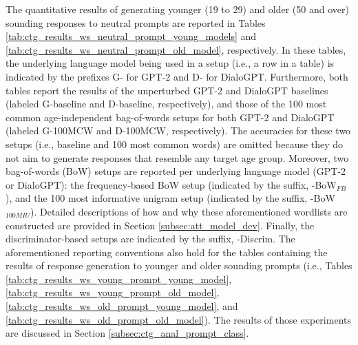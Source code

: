 
The quantitative results of generating younger (19 to 29) and older (50 and over) sounding responses to neutral prompts are reported in Tables \ref{tab:ctg_results_ws_neutral_prompt_young_models} and \ref{tab:ctg_results_ws_neutral_prompt_old_model}, respectively. In these tables, the underlying language model being used in a setup (i.e., a row in a table) is indicated by the prefixes G- for GPT-2 and D- for DialoGPT. Furthermore, both tables report the results of the unperturbed GPT-2 and DialoGPT baselines (labeled G-baseline and D-baseline, respectively), and those of the 100 most common age-independent bag-of-words setups for both GPT-2 and DialoGPT (labeled G-100MCW and D-100MCW, respectively). The accuracies for these two setups (i.e., baseline and 100 most common words) are omitted because they do not aim to generate responses that resemble any target age group. Moreover, two bag-of-words (BoW) setups are reported per underlying language model (GPT-2 or DialoGPT): the frequency-based BoW setup (indicated by the suffix, -BoW$_{FB}$), and the 100 most informative unigram setup (indicated by the suffix, -BoW$_{100MIU}$). Detailed descriptions of how and why these aforementioned wordlists are constructed are provided in Section \ref{subsec:att_model_dev}. Finally, the discriminator-based setups are indicated by the suffix, -Discrim. The aforementioned reporting conventions also hold for the tables containing the results of response generation to younger and older sounding prompts (i.e., Tables \ref{tab:ctg_results_ws_young_prompt_young_model}, \ref{tab:ctg_results_ws_young_prompt_old_model}, \ref{tab:ctg_results_ws_old_prompt_young_model}, and \ref{tab:ctg_results_ws_old_prompt_old_model}). The results of those experiments are discussed in Section \ref{subsec:ctg_anal_prompt_class}.

